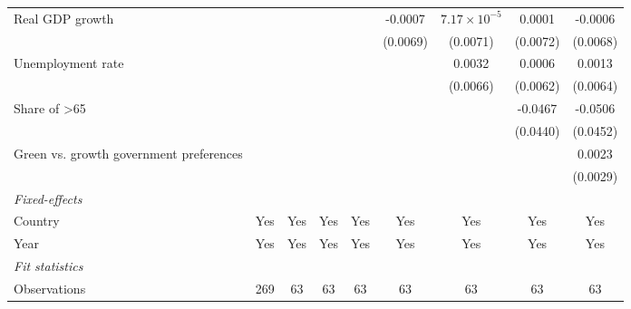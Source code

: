 \begin{table}[htbp]
\begin{tabular}{lcccccccc}
      Real GDP growth                                                  &               &          &              &                & -0.0007        & $7.17\times 10^{-5}$  & 0.0001         & -0.0006\\   
                                                                       &               &          &              &                & (0.0069)       & (0.0071)              & (0.0072)       & (0.0068)\\   
      Unemployment rate                                                &               &          &              &                &                & 0.0032                & 0.0006         & 0.0013\\   
                                                                       &               &          &              &                &                & (0.0066)              & (0.0062)       & (0.0064)\\   
      Share of >65                                                     &               &          &              &                &                &                       & -0.0467        & -0.0506\\   
                                                                       &               &          &              &                &                &                       & (0.0440)       & (0.0452)\\   
      Green vs. growth government preferences                          &               &          &              &                &                &                       &                & 0.0023\\   
                                                                       &               &          &              &                &                &                       &                & (0.0029)\\   
      \midrule
      \emph{Fixed-effects}\\
      Country                                                          & Yes           & Yes      & Yes          & Yes            & Yes            & Yes                   & Yes            & Yes\\  
      Year                                                             & Yes           & Yes      & Yes          & Yes            & Yes            & Yes                   & Yes            & Yes\\  
      \midrule
      \emph{Fit statistics}\\
      Observations                                                     & 269           & 63       & 63           & 63             & 63             & 63                    & 63             & 63\\  

\end{tabular}
\end{table}
